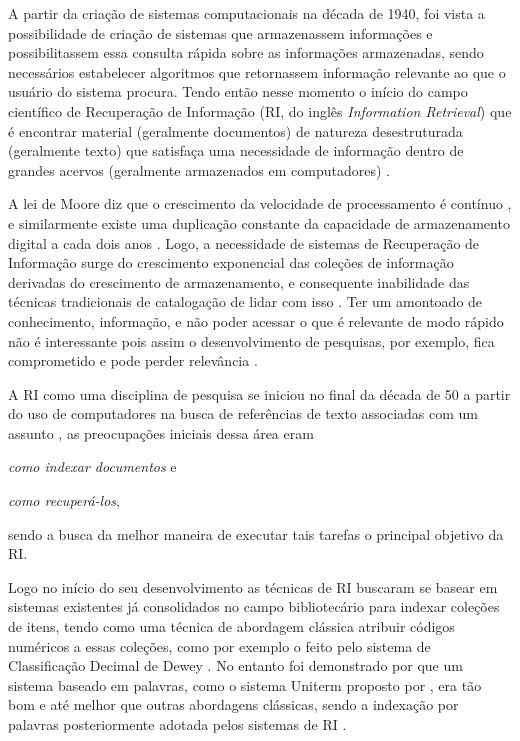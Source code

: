     
    
    A partir da criação de sistemas computacionais na década de 1940, foi vista a possibilidade de criação de sistemas que armazenassem informações e possibilitassem essa consulta rápida sobre as informações armazenadas, sendo necessários estabelecer algoritmos que retornassem informação relevante ao que o usuário do sistema procura. 
    Tendo então nesse momento o início do campo científico de Recuperação de Informação (RI, do inglês \textit{Information Retrieval}) que é encontrar material (geralmente documentos) de natureza desestruturada (geralmente texto) que satisfaça uma necessidade de informação dentro de grandes acervos (geralmente armazenados em computadores) \cite[p.~1]{Manning2008IIR}.
    
    A lei de Moore diz que o crescimento da velocidade de processamento é contínuo \cite{Moore1975}, e similarmente existe uma duplicação constante da capacidade de armazenamento digital a cada dois anos \cite{Kryder2005}. 
    Logo, a necessidade de sistemas de Recuperação de Informação surge do crescimento exponencial das coleções de informação derivadas do crescimento de armazenamento, e consequente inabilidade das técnicas tradicionais de catalogação de lidar com isso \cite{Sanderson2012THIRR}.
    Ter um amontoado de conhecimento, informação, e não poder acessar o que é relevante de modo rápido não é interessante pois assim o desenvolvimento de pesquisas, por exemplo, fica comprometido e pode perder relevância \cite{Bush:1979:WMT:1113634.1113638}.
    
    A RI como uma disciplina de pesquisa se iniciou no final da década de 50 a partir do uso de computadores na busca de referências de texto associadas com um assunto \cite[p.~3]{Sanderson2012THIRR}, as preocupações iniciais dessa área eram 
    \begin{enumerate*}[label=(\alph*)]
    \item \textit{como indexar documentos} e \item \textit{como recuperá-los},
    \end{enumerate*}
    sendo a busca da melhor maneira de executar tais tarefas o principal objetivo da RI.
    
    Logo no início do seu desenvolvimento as técnicas de RI buscaram se basear em sistemas existentes já consolidados no campo bibliotecário para indexar coleções de itens, tendo como uma técnica de abordagem clássica atribuir códigos numéricos a essas coleções, como por exemplo o feito pelo sistema de Classificação Decimal de Dewey \cite[p.~1446]{Sanderson2012THIRR}.
    No entanto foi demonstrado por  que um sistema baseado em palavras, como o sistema Uniterm proposto por , era tão bom e até melhor que outras abordagens clássicas, sendo a indexação por palavras posteriormente adotada pelos sistemas de RI \cite[p.~1446]{Sanderson2012THIRR}.
    
